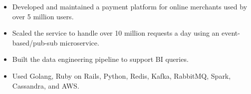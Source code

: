  {
    \begin{itemize}
        \item Developed and maintained a payment platform for online merchants
              used by over 5 million users.
        \item Scaled the service to handle over 10 million requests a day using an
              event-based/pub-sub microservice.
        \item Built the data engineering pipeline to support BI queries.
        \item Used Golang, Ruby on Rails, Python, Redis, Kafka, RabbitMQ, Spark,
              Cassandra, and AWS.
    \end{itemize}
}
